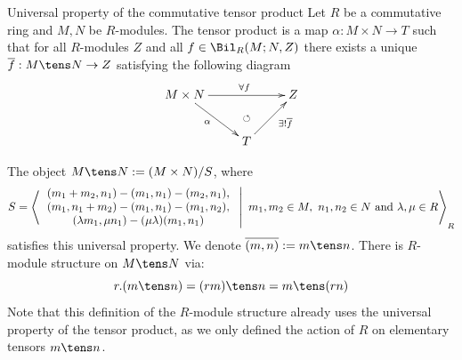 \documentclass[twoside = false,	%
		headsepline,		%
		parskip = true,
		]{scrbook}						%
\begin{document}
    \begin{definition*}{Universal property of the commutative tensor product}{}
        Let $R$ be a commutative ring and $M,N$ be $R$-modules. The tensor product is a map $\alpha: M \times N \to T$ such that for all $R$-modules $Z$ and all $f \in \Bil_R(M;N,Z)$ there exists a unique $\overline{f}: M \tens N \to Z$ satisfying the following diagram
        \begin{equation*}
        \xymatrix {
            M \times N \ar[rr]^(.55){\forall f} \ar[dr]_(.45){\alpha}& & Z \\
            & T \ar@{}[u]|{\circlearrowleft}\ar[ur]_(.6){\exists ! \overline{f}}
        }
        \end{equation*}
    \end{definition*}
    The object $M \tens N :=(M \times N)/S$, where
        \begin{equation*}
            \begin{split}
                S = \left\langle  \left. \begin{array}{c}
                    (m_1+m_2,n_1) - (m_1,n_1) - (m_2,n_1), \\ (m_1,n_1 + m_2) - (m_1,n_1) - (m_1,n_2),  \\
                    (\lambda m_1, \mu n_1) - (\mu\lambda)( m_1, n_1) 
                \end{array}  \ \right| \ m_1,m_2 \in M, \ n_1,n_2 \in N \text{ and } \lambda,\mu \in R \right\rangle_R        
            \end{split}
        \end{equation*}
    satisfies this universal property. We denote $\overline{(m,n)}:= m \tens n$.
    There is $R$-module structure on $M \tens N$ via:
    \begin{equation*}
        r.(m \tens n) = (rm) \tens n = m \tens (rn)
    \end{equation*}
    Note that this definition of the $R$-module structure already uses the universal property of the tensor product, as we only defined the action of $R$ on elementary tensors $m \tens n$.
\end{document}
